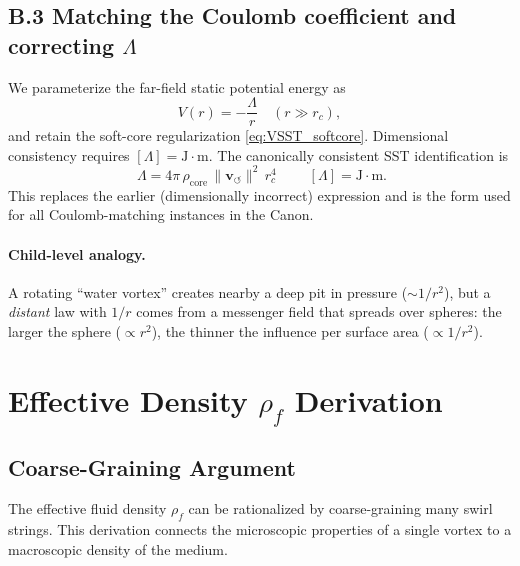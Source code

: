     \subsection*{B.3 Matching the Coulomb coefficient and correcting $\Lambda$}
    We parameterize the far-field static potential energy as
    \begin{equation}
    V(r)=-\frac{\Lambda}{r}\quad (r\gg r_c),
    \end{equation}
    and retain the soft-core regularization \eqref{eq:VSST_softcore}. Dimensional consistency requires
    $[\Lambda]=\mathrm{J\cdot m}$.
    The canonically consistent SST identification is
    \begin{equation}
    \boxed{\;\Lambda = 4\pi\,\rho_{\text{core}}\,\lVert \mathbf{v}_{\!\boldsymbol{\circlearrowleft}}\rVert^{2}\,r_c^{4}\;}
    \qquad [\Lambda]=\mathrm{J\cdot m}.
    \label{eq:Lambda_correct}
    \end{equation}
    This replaces the earlier (dimensionally incorrect) expression and is the form used for all Coulomb-matching instances in the Canon.

    \paragraph{Child-level analogy.}
    A rotating ``water vortex'' creates nearby a deep pit in pressure ($\sim 1/r^2$),
    but a \emph{distant} law with $1/r$ comes from a messenger field that spreads over spheres:
    the larger the sphere ($\propto r^2$), the thinner the influence per surface area ($\propto 1/r^2$).


    \section{Effective Density $\rho_f$ Derivation}
        \subsection{Coarse-Graining Argument}
            The effective fluid density $\rho_f$ can be rationalized by coarse-graining many swirl strings. This derivation connects the microscopic properties of a single vortex to a macroscopic density of the medium.

